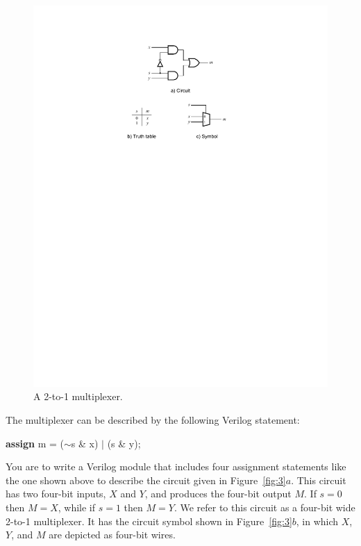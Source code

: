 \documentclass[epsfig,10pt,fullpage]{article}
\begin{document}
\begin{figure}[H]
	\begin{center}
		\includegraphics[scale=.8]{figures/figure2.pdf}
	\end{center}
	\caption{A 2-to-1 multiplexer.}
	\label{fig:2}
\end{figure}

The multiplexer can be described by the following Verilog statement:

\begin{center}
\begin{minipage}[t]{12.5 cm}
\begin{tabbing}
{\bf assign} m = ($\sim$s \& x) $\mid$ (s \& y);
\end{tabbing}
\end{minipage}
\end{center}

\newpage
You are to write a Verilog module that includes four
assignment statements like the one shown above to describe the circuit given 
in Figure~\ref{fig:3}$a$.
This circuit has two four-bit inputs, $X$ and $Y$, and produces the four-bit output
$M$. If $s=0$ then $M = X$, while if $s=1$ then $M=Y$. We refer to this circuit as a four-bit
wide 2-to-1 multiplexer. It has the circuit symbol shown in  Figure~\ref{fig:3}$b$, in which $X$,
$Y$, and $M$ are depicted as four-bit wires.
\end{document}
